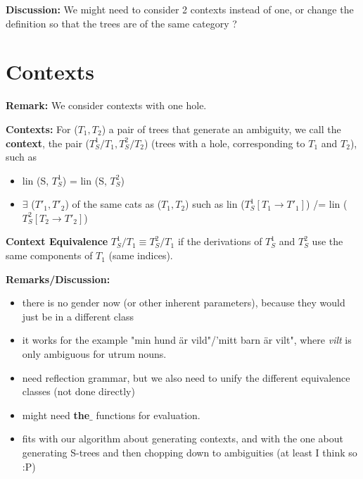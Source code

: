 \documentclass[]{article}
\begin{document}
\textbf{Discussion:}
We might need to consider 2 contexts instead of one, or change the
definition so that the trees are of the same category ?


 
\section{Contexts} 

\textbf{Remark:} We consider contexts with one hole. 

\textbf{Contexts:}
For ($T_1,T_2$) a pair of trees that generate an ambiguity, we call
the \textbf{context}, the pair ($T_S^1/T_1, T_S^2/T_2$) (trees with a
hole, corresponding to $T_1$ and $T_2$), such as
\begin{itemize}
\item lin (S, $T_S^1$) = lin (S, $T_S^2$)
\item $\exists$ ($T'_1, T'_2$) of the same cats as ($T_1,T_2$) such as 
lin ($T_S^1 [T_1 \to T'_1]$) /= lin ($T_S^2 [T_2 \to T'_2]$)
\end{itemize}
 
\vspace{10mm}

\textbf{Context Equivalence}
$T_S^1/T_1 \equiv T_S^2/T_1$ 
if the derivations of $T_S^1$ and
$T_S^2$ use the same components of $T_1$ (same indices).



\textbf{Remarks/Discussion:}
\begin{itemize}
\item there is no gender now (or other inherent parameters), because
  they would just be in a different class
\item it works for the example "min hund \"{a}r vild"/'mitt barn
  \"{a}r vilt", where {\it vilt} is only ambiguous for utrum nouns.
\item need reflection grammar, but we also need to unify the different
  equivalence classes (not done directly)
\item might need \textbf{the$\_$} functions for evaluation.
\item fits with our algorithm about generating contexts, and with the
  one about generating S-trees and then chopping down to ambiguities
  (at least I think so :P) 
\end{itemize}
\end{document}
